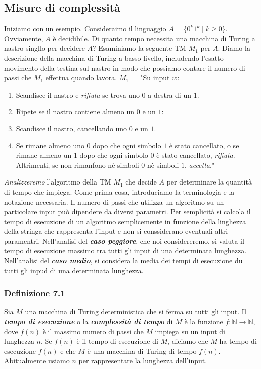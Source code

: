 \documentclass{article}
\begin{document}
\subsection{Misure di complessità}
Iniziamo con un esempio.
Consideraimo il linguaggio $A = \{0^k1^k \mid k \geq 0\}$.
Ovviamente, $A$ è decidibile.
Di quanto tempo necessita una macchina di Turing a nastro singllo per decidere $A$?
\newline
Esaminiamo la seguente TM $M_1$ per $A$.
Diamo la descrizione della macchina di Turing a basso livello, includendo l'esatto movimento della testina sul nastro in modo che possiamo contare il numero di passi che $M_1$ effettua quando lavora.
\vspace{1em}
\text{}
\newline
$M_1 =$ "Su input $w$:
\begin{enumerate}
    \item Scandisce il nastro e \textit{rifiuta} se trova uno $0$ a destra di un $1$.
    \item Ripete se il nastro contiene almeno un $0$ e un $1$:
    \item \quad Scandisce il nastro, cancellando uno $0$ e un $1$.
    \item Se rimane almeno uno $0$ dopo che ogni simbolo $1$  è stato cancellato, o se rimane almeno un $1$ dopo che ogni simbolo $0$ è stato cancellato, \textit{rifiuta}. Altrimenti, se non rimanfono nè simboli $0$ nè simboli $1$, \textit{accetta}."
\end{enumerate}
\textit{Analizzeremo} l'algoritmo della TM $M_1$ che decide $A$ per determinare la quantità di tempo che impiega.
Come prima cosa, introduciamo la terminologia e la notazione necessaria.
Il numero di passi che utilizza un algoritmo su un particolare input può dipendere da diversi parametri.
Per semplicità si calcola il tempo di esecuzione di un algoritmo semplicemente in funzione della linghezza della stringa che rappresenta l'input e non si conssiderano eventuali altri paramentri.
Nell'analisi del \textit{\textbf{caso peggiore}}, che noi considereremo, si valuta il tempo di esecuzione massimo tra tutti gli input di una determinata lunghezza.
Nell'analisi del \textit{\textbf{caso medio}}, si considera la media dei tempi di esecuzione du tutti gli inpud di una determinata lunghezza.
\newline
\subsubsection*{Definizione 7.1}
\label{definizione-7.1}
\begin{tcolorbox}[colback=yellow!10!white, colframe=yellow!50!black, title=Definizione 7.1]
    Sia $M$ una macchina di Turing deterministica che si ferma su tutti gli input. 
    Il \textbf{\textit{tempo di esecuzione}} o la \textbf{\textit{complessità di tempo}} di $M$ è la funzione $f : \mathbb{N} \rightarrow \mathbb{N}$, dove $f(n)$ è il massimo numero di passi che $M$ impiega su un input di lunghezza $n$.
    Se $f(n)$ è il tempo di esecuzione di $M$, diciamo che $M$ ha tempo di esecuzione $f(n)$ e che $M$ è una macchina di Turing di tempo $f(n)$.
    Abitualmente usiamo $n$ per rappresentare la lunghezza dell'input.
\end{tcolorbox}
\end{document}
